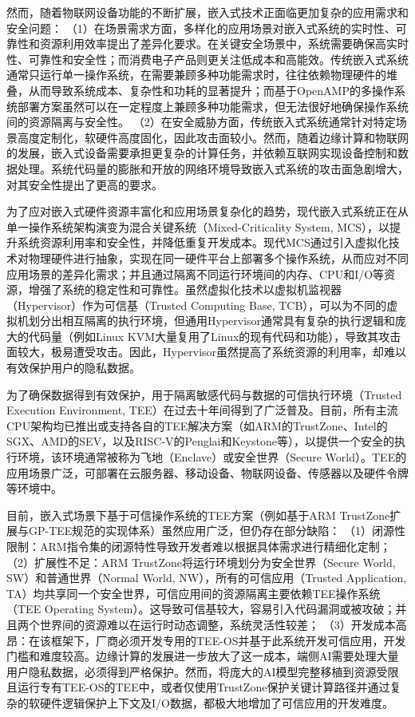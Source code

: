 \documentclass[master, vlined, review]{DissertUESTC}
\begin{document}
	然而，随着物联网设备功能的不断扩展，嵌入式技术正面临更加复杂的应用需求和安全问题：
	（1）在场景需求方面，多样化的应用场景对嵌入式系统的实时性、可靠性和资源利用效率提出了差异化要求。在关键安全场景中，系统需要确保高实时性、可靠性和安全性；而消费电子产品则更关注低成本和高能效。传统嵌入式系统通常只运行单一操作系统，在需要兼顾多种功能需求时，往往依赖物理硬件的堆叠，从而导致系统成本、复杂性和功耗的显著提升；而基于OpenAMP的多操作系统部署方案虽然可以在一定程度上兼顾多种功能需求，但无法很好地确保操作系统间的资源隔离与安全性。
	（2）在安全威胁方面，传统嵌入式系统通常针对特定场景高度定制化，软硬件高度固化，因此攻击面较小。然而，随着边缘计算和物联网的发展，嵌入式设备需要承担更复杂的计算任务，并依赖互联网实现设备控制和数据处理。系统代码量的膨胀和开放的网络环境导致嵌入式系统的攻击面急剧增大，对其安全性提出了更高的要求。
	
	为了应对嵌入式硬件资源丰富化和应用场景复杂化的趋势，现代嵌入式系统正在从单一操作系统架构演变为混合关键系统（Mixed-Criticality System, MCS），以提升系统资源利用率和安全性，并降低重复开发成本。现代MCS通过引入虚拟化技术对物理硬件进行抽象，实现在同一硬件平台上部署多个操作系统，从而应对不同应用场景的差异化需求；并且通过隔离不同运行环境间的内存、CPU和I/O等资源，增强了系统的稳定性和可靠性。虽然虚拟化技术以虚拟机监视器（Hypervisor）作为可信基（Trusted Computing Base, TCB），可以为不同的虚拟机划分出相互隔离的执行环境，但通用Hypervisor通常具有复杂的执行逻辑和庞大的代码量（例如Linux KVM大量复用了Linux的现有代码和功能），导致其攻击面较大，极易遭受攻击。因此，Hypervisor虽然提高了系统资源的利用率，却难以有效保护用户的隐私数据。
	
	为了确保数据得到有效保护，用于隔离敏感代码与数据的可信执行环境（Trusted Execution Environment, TEE）在过去十年间得到了广泛普及。目前，所有主流CPU架构均已推出或支持各自的TEE解决方案（如ARM的TrustZone、Intel的SGX、AMD的SEV，以及RISC-V的Penglai和Keystone等），以提供一个安全的执行环境，该环境通常被称为飞地（Enclave）或安全世界（Secure World）。TEE的应用场景广泛，可部署在云服务器、移动设备、物联网设备、传感器以及硬件令牌等环境中。
	
	目前，嵌入式场景下基于可信操作系统的TEE方案（例如基于ARM TrustZone扩展与GP-TEE规范的实现体系）虽然应用广泛，但仍存在部分缺陷：
	（1）闭源性限制：ARM指令集的闭源特性导致开发者难以根据具体需求进行精细化定制；
	（2）扩展性不足：ARM TrustZone将运行环境划分为安全世界（Secure World, SW）和普通世界（Normal World, NW），所有的可信应用（Trusted Application, TA）均共享同一个安全世界，可信应用间的资源隔离主要依赖TEE操作系统（TEE Operating System）。这导致可信基较大，容易引入代码漏洞或被攻破；并且两个世界间的资源难以在运行时动态调整，系统灵活性较差；
	（3）开发成本高昂：在该框架下，厂商必须开发专用的TEE-OS并基于此系统开发可信应用，开发门槛和难度较高。边缘计算的发展进一步放大了这一成本，端侧AI需要处理大量用户隐私数据，必须得到严格保护。然而，将庞大的AI模型完整移植到资源受限且运行专有TEE-OS的TEE中，或者仅使用TrustZone保护关键计算路径并通过复杂的软硬件逻辑保护上下文及I/O数据，都极大地增加了可信应用的开发难度。
	
\end{document}
